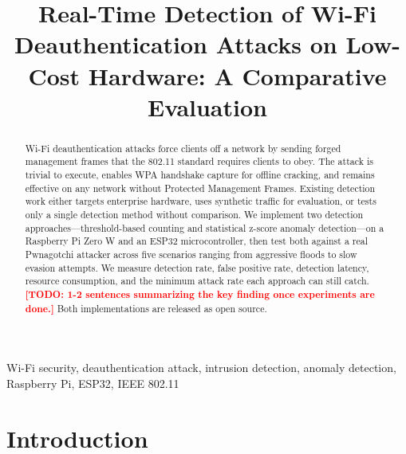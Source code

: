 \documentclass[conference]{IEEEtran}
\newcommand{\placeholder}[1]{\textcolor{red}{\textbf{[TODO: #1]}}}
\begin{document}
\title{Real-Time Detection of Wi-Fi Deauthentication Attacks on Low-Cost Hardware: A Comparative Evaluation}

\author{
}

\maketitle

\begin{abstract}
Wi-Fi deauthentication attacks force clients off a network by sending forged management frames that the 802.11 standard requires clients to obey. The attack is trivial to execute, enables WPA handshake capture for offline cracking, and remains effective on any network without Protected Management Frames. Existing detection work either targets enterprise hardware, uses synthetic traffic for evaluation, or tests only a single detection method without comparison. We implement two detection approaches---threshold-based counting and statistical z-score anomaly detection---on a Raspberry Pi Zero W and an ESP32 microcontroller, then test both against a real Pwnagotchi attacker across five scenarios ranging from aggressive floods to slow evasion attempts. We measure detection rate, false positive rate, detection latency, resource consumption, and the minimum attack rate each approach can still catch. \placeholder{1-2 sentences summarizing the key finding once experiments are done.} Both implementations are released as open source.
\end{abstract}

\begin{IEEEkeywords}
Wi-Fi security, deauthentication attack, intrusion detection, anomaly detection, Raspberry Pi, ESP32, IEEE 802.11
\end{IEEEkeywords}

\section{Introduction}
\end{document}
